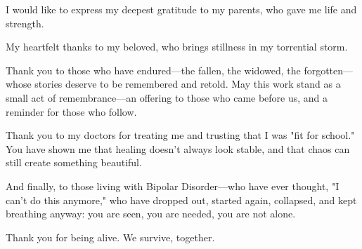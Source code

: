 \documentclass[../1_thesis]{subfiles}
\begin{document}
\begin{acknowledgementslong}
I would like to express my deepest gratitude to my parents, who gave me life and strength.

My heartfelt thanks to my beloved, who brings stillness in my torrential storm.

Thank you to those who have endured—the fallen, the widowed, the forgotten---whose stories deserve to be remembered and retold.  
May this work stand as a small act of remembrance—an offering to those who came before us, and a reminder for those who follow.

Thank you to my doctors for treating me and trusting that I was "fit for school." 
You have shown me that healing doesn't always look stable, and that chaos can still create something beautiful.

And finally, to those living with Bipolar Disorder—who have ever thought, "I can't do this anymore," 
who have dropped out, started again, collapsed, and kept breathing anyway:  
you are seen, you are needed, you are not alone.  

Thank you for being alive.
We survive, together.

\end{acknowledgementslong}
\end{document}
